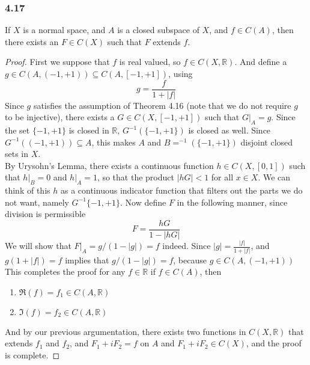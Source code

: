 \documentclass[../../main.tex]{subfiles}
\begin{document}
\subsubsection*{4.17}
\begin{wts}
If $X$ is a normal space, and $A$ is a closed subspace of $X$, and $f\in C(A)$, then there exists an $F\in C(X)$ such that $F$ extends $f$.
\end{wts}
\begin{proof}
First we suppose that $f$ is real valued, so $f\in C(X, \mathbb{R})$. And define a $g\in C(A, (-1, +1))\subseteq C(A, [-1,+1])$, using
\[
g= \dfrac{f}{1+|f|}
\]
Since $g$ satisfies the assumption of Theorem 4.16 (note that we do not require $g$ to be injective), there exists a $G\in C(X, [-1, +1])$ such that $G|_A = g$. Since the set $\{-1,+1\}$ is closed in $\mathbb{R}$, $G^{-1}(\{-1,+1\})$ is closed as well. Since $G^{-1}((-1,+1))\subseteq A$, this makes $A$ and $B=^{-1}(\{-1,+1\})$ disjoint closed sets in $X$.\\

By Urysohn's Lemma, there exists a continuous function $h\in C(X, [0,1])$ such that $h|_B = 0$ and $h|_A =1$, so that the product $|hG|< 1$ for all $x\in X$. We can think of this $h$ as a continuous indicator function that filters out the parts we do not want, namely $G^{-1}\{-1,+1\}$. Now define $F$ in the following manner, since division is permissible
\[
F = \dfrac{hG}{1-|hG|}
\]
We will show that $F|_A = g/(1-|g|) = f$ indeed. Since $|g| = \frac{|f|}{1+|f|}$, and $g(1+|f|) = f$ implies that $g/(1-|g|) = f$, because $g\in C(A,(-1,+1))$ This completes the proof for any $f\in\mathbb{R}$ if $f\in C(A)$, then
\begin{enumerate}
    \item $\Re(f) = f_1\in C(A,\mathbb{R})$
    \item $\Im(f) = f_2\in C(A,\mathbb{R})$
\end{enumerate}
And by our previous argumentation, there exists two functions in $C(X, \mathbb{R})$ that extends $f_1$ and $f_2$, and $F_1 + iF_2 = f$ on $A$ and $F_1 + iF_2\in C(X)$, and the proof is complete.
\end{proof}
\end{document}
